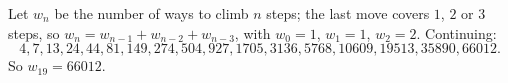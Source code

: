 Let $w_n$ be the number of ways to climb $n$ steps; the last move covers $1$, $2$ or $3$ steps, so $w_n=w_{n-1}+w_{n-2}+w_{n-3}$, with $w_0=1$, $w_1=1$, $w_2=2$. Continuing:
\[4,7,13,24,44,81,149,274,504,927,1705,3136,5768,10609,19513,35890,66012.\]
So $w_{19}=\boxed{66012}$.
